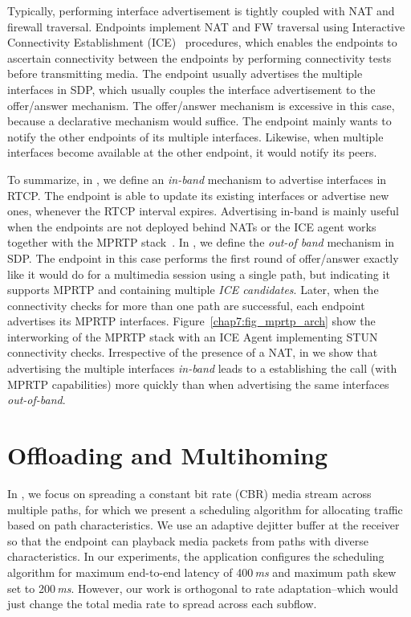 Typically, performing interface advertisement is tightly coupled with NAT and
firewall traversal. Endpoints implement NAT and FW traversal using Interactive
Connectivity Establishment (ICE)~\cite{rfc5245} procedures, which enables the
endpoints to ascertain connectivity between the endpoints by performing
connectivity tests before transmitting media. The endpoint usually advertises
the multiple interfaces in SDP, which usually couples the interface
advertisement to the offer/answer mechanism. The offer/answer mechanism is
excessive in this case, because a declarative mechanism would suffice. The
endpoint mainly wants to notify the other endpoints of its multiple
interfaces. Likewise, when multiple interfaces become available at the other
endpoint, it would notify its peers.

To summarize, in \cite{draft.mprtp}, we define an \emph{in-band} mechanism to
advertise interfaces in RTCP. The endpoint is able to update its existing
interfaces or advertise new ones, whenever the RTCP interval expires.
Advertising in-band is mainly useful when the endpoints are not deployed
behind NATs or the ICE agent works together with the MPRTP
stack~\cite{draft.mice}. In \cite{draft.mprtp.sdp}, we define the \emph{out-of
band} mechanism in SDP. The endpoint in this case performs the first round of
offer/answer exactly like it would do for a multimedia session using a single
path, but indicating it supports MPRTP and containing multiple \emph{ICE
candidates}. Later, when the connectivity checks for more than one path are
successful, each endpoint advertises its MPRTP interfaces.
Figure~\ref{chap7:fig_mprtp_arch} show the interworking of the MPRTP stack
with an ICE Agent implementing STUN connectivity checks. Irrespective of the
presence of a NAT, in  we show that advertising the multiple
interfaces \emph{in-band} leads to a establishing the call (with MPRTP
capabilities) more quickly than when advertising the same interfaces
\emph{out-of-band}.


\section{Offloading and Multihoming}

In , we focus on spreading a constant bit rate (CBR) media
stream across multiple paths, for which we present a scheduling algorithm for
allocating traffic based on path characteristics. We use an adaptive dejitter
buffer at the receiver so that the endpoint can playback media packets from
paths with diverse characteristics. In our experiments, the application
configures the scheduling algorithm for maximum end-to-end latency of
400\,\emph{ms} and maximum path skew set to 200\,\emph{ms}. However, our work
is orthogonal to rate adaptation--which would just change the total media rate
to spread across each subflow.


